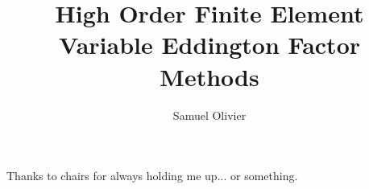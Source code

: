 \documentclass{dissertation}
\begin{document}
\title{High Order Finite Element Variable Eddington Factor Methods}
\author{Samuel Olivier}

\maketitle
\copyrightpage

\begin{abstract}

\end{abstract}

\begin{frontmatter}

\begin{KeepFromToc}
\tableofcontents
\end{KeepFromToc}
\clearpage
\listoffigures
\clearpage
\listoftables
\clearpage

\begin{acknowledgements}
Thanks to chairs for always holding me up... or something. 
\end{acknowledgements}
\end{frontmatter}

\pagestyle{headings}

\clearpage
\printbibliography
\end{document}
